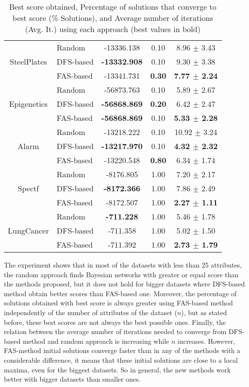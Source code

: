 \begin{table}[ h ]
\begin{tabular}{|c|l|c|c|c|}
			\multirow{3}{*}{SteelPlates} & Random & -13336.138 & 0.10 & 8.96 $\pm$ 3.43 \\ \cline{2-5} 
					& DFS-based & \textbf{-13332.908} & 0.10 & 9.30 $\pm$ 3.38 \\ \cline{2-5}
					& FAS-based & -13341.731 & \textbf{0.30} & \textbf{7.77 $\pm$ 2.24} \\ \hline
			\multirow{3}{*}{Epigenetics} & Random & -56873.763 & 0.10 & 5.89 $\pm$ 2.67 \\ \cline{2-5} 
					& DFS-based & \textbf{-56868.869} & \textbf{0.20} & 6.42 $\pm$ 2.47 \\ \cline{2-5}
					& FAS-based & \textbf{-56868.869} & 0.10 & \textbf{5.33 $\pm$ 2.28} \\ \hline
			\multirow{3}{*}{Alarm} & Random & -13218.222 & 0.10 & 10.92 $\pm$ 3.24 \\ \cline{2-5} 
					& DFS-based & \textbf{-13217.970} & 0.10 & \textbf{4.32 $\pm$ 2.32} \\ \cline{2-5}
					& FAS-based & -13220.548 & \textbf{0.80} & 6.34 $\pm$ 1.74 \\ \hline
			\multirow{3}{*}{Spectf} & Random & -8176.805 & 1.00 & 7.20 $\pm$ 2.17 \\ \cline{2-5} 
					& DFS-based & \textbf{-8172.366} & 1.00 & 7.86 $\pm$ 2.49 \\ \cline{2-5}
					& FAS-based & -8172.507 & 1.00 & \textbf{2.27 $\pm$ 1.11} \\ \hline
			\multirow{3}{*}{LungCancer} & Random & \textbf{-711.228} & 1.00 & 5.46 $\pm$ 1.78 \\ \cline{2-5} 
					& DFS-based & -711.358 & 1.00 & 5.02 $\pm$ 1.50 \\ \cline{2-5}
					& FAS-based & -711.392 & 1.00 & \textbf{2.73 $\pm$ 1.79} \\ \hline
		\end{tabular}
		\caption{Best score obtained, Percentage of solutions that converge to best score (\% Solutions), and Average number of iterations (Avg. It.) using each approach (best values in bold)}
		\label{tab:comparison}
	\end{table}
	\vspace{-4mm}
The experiment shows that in most of the datasets with less than 25 attributes, the random approach finds Bayesian networks with greater or equal score than the methods proposed, but it does not hold for bigger datasets where DFS-based method obtain better scores than FAS-based one. Moreover, the percentage of solutions obtained with best score is always greater using FAS-based method independently of the number of attributes of the dataset ($n$), but as stated before, these best scores are not always the best possible ones. Finally, the relation between the average number of iterations needed to converge from DFS-based method and random approach is increasing while $n$ increases. However, FAS-method initial solutions converge faster than in any of the methods with a considerable difference, it means that these initial solutions are close to a local maxima, even for the biggest datasets. So in general, the new methods work better with bigger datasets than smaller ones.


